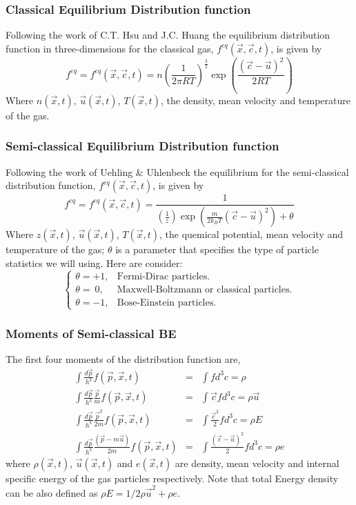 \begin{frame}
	\frametitle{Classical Equilibrium Distribution function}
	Following the work of C.T. Hsu \cite{ISI:000303761300021} and J.C. Huang \cite{Huang2011261} the equilibrium distribution function in three-dimensions for the classical gas, $f^{eq}(\vec{x},\vec{c},t)$, is given by
	\begin{equation}
	f^{eq}=f^{eq}(\vec{x},\vec{c},t)=n \left( \frac{1}{2 \pi RT} \right)^{\frac{3}{2}} \exp\left({\frac{(\vec{c}-\vec{u})^2}{2 R T}}
\right)
	\label{eq:classical_feq}
	\end{equation}
	Where $n(\vec{x},t)$, $\vec{u}(\vec{x},t)$, $T(\vec{x},t)$, the density, mean velocity and temperature of the gas.
\end{frame}


\begin{frame}
	\frametitle{Semi-classical Equilibrium Distribution function}
	Following the work of Uehling \& Uhlenbeck \cite{PhysRev.43.552} the equilibrium for the semi-classical distribution function, $f^{eq}(\vec{x},\vec{c},t)$, is given by
	\begin{equation}
	f^{eq}=f^{eq}(\vec{x},\vec{c},t)=\frac{1}{(\frac{1}{z})\exp\left({\frac{m}{2 k_B T}(\vec{c}-\vec{u})^2}\right)+\theta}
	\label{eq:semiclassical_feq}
	\end{equation}
	Where $z(\vec{x},t)$, $\vec{u}(\vec{x},t)$, $T(\vec{x},t)$, the quemical potential, mean velocity and temperature of the gas; $\theta$ is a parameter that specifies the type of particle statistics we will using. Here are consider:
	\[
		\begin{cases}
		\theta = +1, 	& \text{Fermi-Dirac particles.} \\
		\theta = \ 0,	& \text{Maxwell-Boltzmann or classical particles.} \\
		\theta = -1, 	& \text{Bose-Einstein particles.}
		\end{cases}
	\]
\end{frame}
	
\begin{frame}
	\frametitle{Moments of Semi-classical BE}
	The first four moments of the distribution function are,
	\begin{eqnarray}
	\int \frac{d\vec{p}}{h^3} f(\vec{p},\vec{x},t) &=& \int f d^3 c = \rho \\
	\int \frac{d\vec{p}}{h^3} \frac{\vec{p}}{m} f(\vec{p},\vec{x},t) &=& \int \vec{c} f d^3 c = \rho \vec{u} \\
	\int \frac{d\vec{p}}{h^3} \frac{\vec{p}^2}{2m} f(\vec{p},\vec{x},t) &=& \int \frac{\vec{c}^2}{2} f d^3 c = \rho E \\
	\int \frac{d\vec{p}}{h^3} \frac{(\vec{p}-m\vec{u})}{2m} f(\vec{p},\vec{x},t) &=& \int \frac{(\vec{c}-\vec{u})^2}{2} f d^3 c = \rho e 
	\end{eqnarray}
	where $\rho(\vec{x},t)$,  $\vec{u}(\vec{x},t)$ and $e(\vec{x},t)$ are density, mean velocity and internal specific energy of the gas particles respectively. Note that total Energy density can be also defined as $\rho E = 1/2 \rho \vec{u}^2 + \rho e$.
\end{frame}

